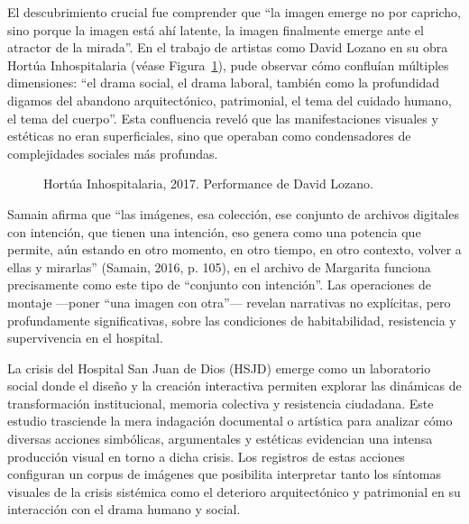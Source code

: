 \textcolor{edit30sept}{El descubrimiento crucial fue comprender que “la imagen emerge no por capricho, sino porque la imagen está ahí latente, la imagen finalmente emerge ante el atractor de la mirada”. En el trabajo de artistas como David Lozano en su obra Hortúa Inhospitalaria (véase Figura~\ref{fig:david_lozano_hortua}), pude observar cómo confluían múltiples dimensiones: “el drama social, el drama laboral, también como la profundidad digamos del abandono arquitectónico, patrimonial, el tema del cuidado humano, el tema del cuerpo”. Esta confluencia reveló que las manifestaciones visuales y estéticas no eran superficiales, sino que operaban como condensadores de complejidades sociales más profundas.}

\begin{figure}[p]
    \thispagestyle{empty}
    \captionsetup{labelformat=empty,textformat=empty}
    \caption{Hortúa Inhospitalaria, 2017. Performance de David Lozano.}
    \label{fig:david_lozano_hortua}
\end{figure}

\textcolor{edit30sept}{Samain afirma que “las imágenes, esa colección, ese conjunto de archivos digitales con intención, que tienen una intención, eso genera como una potencia que permite, aún estando en otro momento, en otro tiempo, en otro contexto, volver a ellas y mirarlas” (Samain, 2016, p. 105), en el archivo de Margarita funciona precisamente como este tipo de “conjunto con intención”. Las operaciones de montaje —poner “una imagen con otra”— revelan narrativas no explícitas, pero profundamente significativas, sobre las condiciones de habitabilidad, resistencia y supervivencia en el hospital.}

La crisis del Hospital San Juan de Dios (HSJD) emerge como un laboratorio social donde el diseño y la creación interactiva permiten explorar las dinámicas de transformación institucional, memoria colectiva y resistencia ciudadana. Este estudio trasciende la mera indagación documental o artística para analizar cómo diversas acciones simbólicas, argumentales y estéticas evidencian una intensa producción visual en torno a dicha crisis. Los registros de estas acciones configuran un corpus de imágenes que posibilita interpretar tanto los síntomas visuales de la crisis sistémica como el deterioro arquitectónico y patrimonial en su interacción con el drama humano y social.

